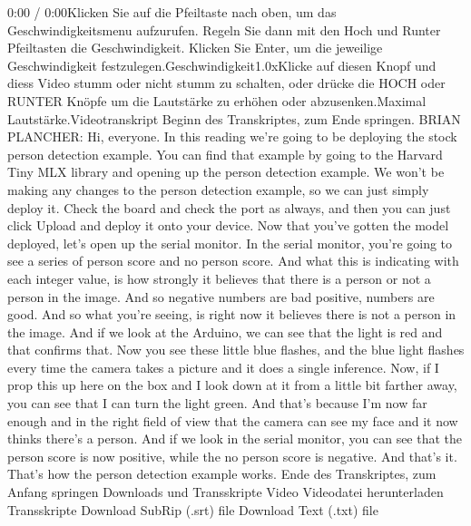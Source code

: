     0:00 / 0:00Klicken Sie auf die Pfeiltaste nach oben, um das Geschwindigkeitsmenu aufzurufen. Regeln Sie dann mit den Hoch und Runter Pfeiltasten die Geschwindigkeit. Klicken Sie Enter, um die jeweilige Geschwindigkeit festzulegen.Geschwindigkeit1.0xKlicke auf diesen Knopf und diess Video stumm oder nicht stumm zu schalten, oder drücke die HOCH oder RUNTER Knöpfe um die Lautstärke zu erhöhen oder abzusenken.Maximal Lautstärke.Videotranskript
    Beginn des Transkriptes, zum Ende springen.
    BRIAN PLANCHER: Hi, everyone.
    In this reading we're going to be deploying the stock person detection
    example.
    You can find that example by going to the Harvard Tiny MLX library
    and opening up the person detection example.
    We won't be making any changes to the person detection example,
    so we can just simply deploy it.
    Check the board and check the port as always,
    and then you can just click Upload and deploy it onto your device.
    Now that you've gotten the model deployed,
    let's open up the serial monitor.
    In the serial monitor, you're going to see a series
    of person score and no person score.
    And what this is indicating with each integer value,
    is how strongly it believes that there is a person or not
    a person in the image.
    And so negative numbers are bad positive, numbers are good.
    And so what you're seeing, is right now it believes
    there is not a person in the image.
    And if we look at the Arduino, we can see that the light is red
    and that confirms that.
    Now you see these little blue flashes, and the blue light
    flashes every time the camera takes a picture and it does a single inference.
    Now, if I prop this up here on the box and I look down at it from a little bit
    farther away, you can see that I can turn the light green.
    And that's because I'm now far enough and in the right field of view
    that the camera can see my face and it now thinks there's a person.
    And if we look in the serial monitor, you
    can see that the person score is now positive,
    while the no person score is negative.
    And that's it.
    That's how the person detection example works.
    Ende des Transkriptes, zum Anfang springen
    Downloads und Transskripte
    Video
    Videodatei herunterladen
    Transskripte
    Download SubRip (.srt) file
    Download Text (.txt) file
    
